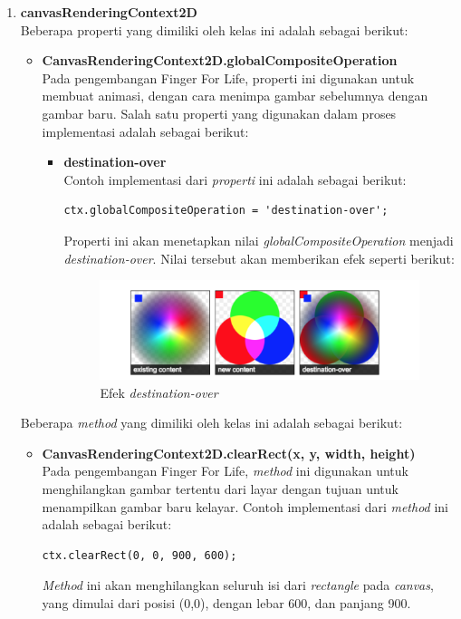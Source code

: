 \begin{enumerate}
\begin{enumerate}
		\item \textbf{canvasRenderingContext2D} \\
		Beberapa properti yang dimiliki oleh kelas ini adalah sebagai berikut:
		\begin{itemize}
			\item \textbf{CanvasRenderingContext2D.globalCompositeOperation} \\
			Pada pengembangan Finger For Life, properti ini digunakan untuk membuat animasi, dengan cara menimpa gambar sebelumnya dengan gambar baru. Salah satu properti yang digunakan dalam proses implementasi adalah sebagai berikut:
			\begin{itemize}
				\item \textbf{destination-over} \\
				Contoh implementasi dari \textit{properti} ini adalah sebagai berikut:
				
\begin{lstlisting}
ctx.globalCompositeOperation = 'destination-over';
\end{lstlisting}
Properti ini akan menetapkan nilai \textit{globalCompositeOperation} menjadi \textit{destination-over}. Nilai tersebut akan memberikan efek seperti berikut:

\begin{figure}[H]
	\centering
	\includegraphics[scale=0.45]{Gambar/canvas_destination}
	\caption{Efek \textit{destination-over}}
	\label{fig:canvas_destination}
\end{figure}
			\end{itemize}
		\end{itemize}
		
		Beberapa \textit{method} yang dimiliki oleh kelas ini adalah sebagai berikut:
		\begin{itemize}
			\item \textbf{CanvasRenderingContext2D.clearRect(x, y, width, height)} \\
			Pada pengembangan Finger For Life, \textit{method} ini digunakan untuk menghilangkan gambar tertentu dari layar dengan tujuan untuk menampilkan gambar baru kelayar. Contoh implementasi dari \textit{method} ini adalah sebagai berikut:
\begin{lstlisting}
ctx.clearRect(0, 0, 900, 600);
\end{lstlisting}
\textit{Method} ini akan menghilangkan seluruh isi dari \textit{rectangle} pada \textit{canvas}, yang dimulai dari posisi (0,0), dengan lebar 600, dan panjang 900.			
			

\end{itemize}
\end{enumerate}
\end{enumerate}
